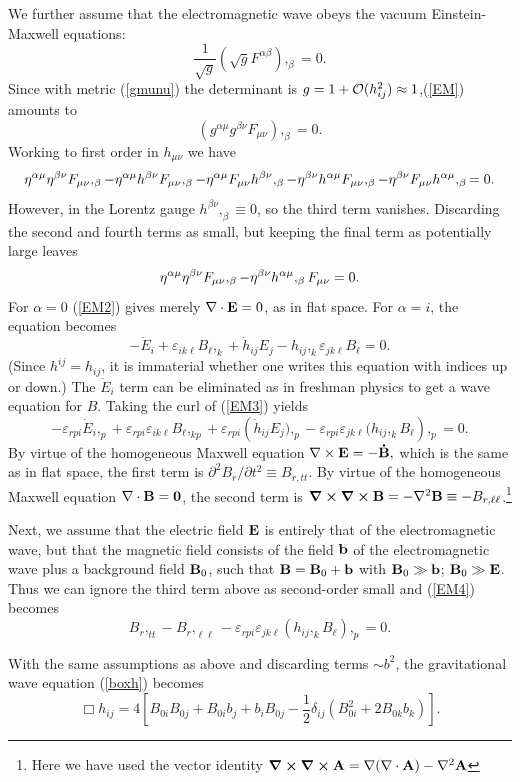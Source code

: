 \documentclass[12pt]{article}
\let\a=\alpha \let\b=\beta  \let\g=\gamma  \let\d=\delta \let\e=\varepsilon
\let\m=\mu    \let\n=\nu    \let\x=\xi     \let\p=\pi    \let\r=\rho
\let\dpr=\partial \def\der{{\rm d}} \let\circa=\cong
\def\be{\begin{equation}}
\def\ee{\end{equation}}
\begin{document}
We further assume that the electromagnetic wave obeys the vacuum Einstein-Maxwell equations:
\be
\frac1{\sqrt g}(\sqrt g F^{\a\b}),_\b = 0 . \label{EM}
\ee
Since with metric (\ref{gmunu}) the determinant is $g = 1 + {\cal O}(h_{ij}^2) \approx 1$,(\ref{EM}) amounts to
\be
(g^{\a\m}g^{\b\n}F_{\m\n}),_\b = 0.
\ee
Working to first order in $h_{\m\n}$ we have
\be
\h^{\a\m} \h^{\b\n} F_{\m\n},_\b - \h^{\a\m}h^{\b\n}F_{\m\n},_\b -\h^{\a\m}F_{\m\n}h^{\b\n},_\b -\h^{\b\n}h^{\a\m}F_{\m\n},_\b -\h^{\b\n}F_{\m\n}h^{\a\m},_\b = 0.
\ee
However, in the Lorentz gauge $h^{\b\n},_\b \equiv 0$, so the third term vanishes. Discarding the second and fourth terms as small, but keeping the final term as potentially large leaves
\be
\h^{\a\m}\h^{\b\n}F_{\m\n},_\b - \h^{\b\n}h^{\a\m},_\b F_{\m\n} = 0.\label{EM2}
\ee
For $\a = 0$  (\ref{EM2}) gives merely ${\bf \nabla \cdot E} = 0$, as in flat space. For $\a = i$, the equation   becomes
\be
-\dot E_i + \e_{ik\ell}B_{\ell},_k + \dot h_{ij}E_j -h_{ij},_k\e_{jk\ell}B_\ell = 0. \label{EM3}
\ee
(Since $h^{ij} = h_{ij}$, it is immaterial whether one writes this equation with indices up or down.) The $\dot E_i$ term can be eliminated as in freshman physics  to get a wave equation for $B$.  Taking the curl of  (\ref{EM3}) yields
\be
-\e_{rpi}\dot E_i,_p + \e_{rpi}\e_{ik\ell}B_\ell ,_{kp}+\e_{rpi}( {\dot h_{ij}E_j),_p - \e_{rpi}\e_{jk\ell}(h_{ij},_k B_\ell}),_p = 0. \label{EM4}
\ee
By virtue of the homogeneous Maxwell equation $\bf \nabla \times E = -\dot B,$ which is the same as in flat space, the first term is $\dpr^2 B_r/\dpr t^2 \equiv B_{r,tt}$. By virtue of the homogeneous Maxwell equation $\bf \nabla \cdot B = 0$, the second term is $\curl\curl \textbf{B} = -\nabla^2 \textbf{B} \equiv - B_{r,\ell \ell}$.\footnote{Here we have used the  vector  identity $\curl \curl \textbf{A} = \nabla (\nabla \cdot \textbf{A}) -\nabla^2 \textbf{A}$}

Next, we assume that the electric field $\bf E$ is entirely that of the electromagnetic wave, but that the magnetic field consists of the field $\bf b$ of the electromagnetic wave plus a  background field ${\bf B}_0$, such that ${\bf B = B}_0 + {\bf b}$
with ${\bf B}_0 \gg \bf b$; ${\bf B}_0 \gg \bf E $. Thus we can ignore the third term above as second-order small and   (\ref{EM4}) becomes
\be
 B_r,_{tt} -B_r,_{\ell\ell} - \e_{rpi}\e_{jk\ell}(h_{ij},_{k}B_\ell),_p = 0. \label{EM6}
\ee

With the same assumptions as above and discarding terms $\sim b^2$, the gravitational wave equation (\ref{boxh}) becomes
\be
\Box h_{ij} = 4[B_{0i}B_{0j} + B_{0i}b_j + b_iB_{0j} -\frac{1}{2} \d_{ij}(B_{0i}^2 + 2 B_{0k}b_k)].\label{boxh2}
\ee
\end{document}
